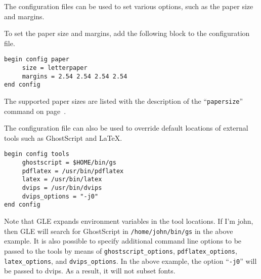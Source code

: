 The configuration files can be used to set various options, such as the paper size and margins.

To set the paper size and margins, add the following block to the configuration file.

\preglecode{}
\begin{verbatim}
begin config paper
     size = letterpaper
     margins = 2.54 2.54 2.54 2.54
end config
\end{verbatim}
\postglecode{}

The supported paper sizes are listed with the description of the ``\texttt{papersize}'' command on page~\pageref{papsiz:cmd}.

The configuration file can also be used to override default locations of external tools such as GhostScript and LaTeX.

\preglecode{}
\begin{verbatim}
begin config tools
     ghostscript = $HOME/bin/gs
     pdflatex = /usr/bin/pdflatex
     latex = /usr/bin/latex
     dvips = /usr/bin/dvips
     dvips_options = "-j0"
end config
\end{verbatim}
\postglecode{}

Note that GLE expands environment variables in the tool locations. If I'm john, then GLE will search for GhostScript in \verb+/home/john/bin/gs+ in the above example. It is also possible to specify additional command line options to be passed to the tools by means of \verb+ghostscript_options+, \verb+pdflatex_options+, \verb+latex_options+, and \verb+dvips_options+. In the above example, the option ``\verb+-j0+'' will be passed to dvips. As a result, it will not subset fonts.
















